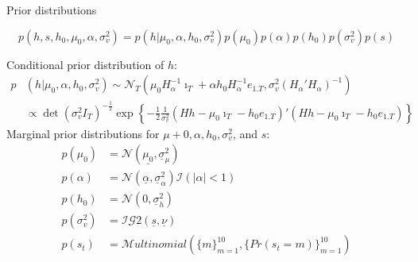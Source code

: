 \documentclass[notes,blackandwhite,mathsans,usenames,dvipsnames]{beamer}
\begin{document}
\begin{frame}{Prior distributions}

\small
{}
$$
p\left(h,s,h_0,\mu_0, \alpha,\sigma_v^2\right) = p\left(h|\mu_0, \alpha,h_0, \sigma_v^2\right) p\left( \mu_0 \right) p\left(\alpha \right)p\left(h_0\right)p\left(\sigma_v^2\right)p\left(s\right)
$$

{\color{mcxs2}Conditional prior distribution of} $h$:
\begin{align*}
p&\left(h|\mu_0, \alpha,h_0, \sigma_v^2\right) \sim\mathcal{N}_T\left(\mu_0 H_\alpha^{-1}\imath_T+ \alpha h_0H_\alpha^{-1}e_{1.T}, \sigma_v^2(H_\alpha'H_\alpha)^{-1} \right)\\
&\propto \det\left(\sigma^2_vI_T\right)^{-
\frac{1}{2}}\exp\left\{ -\frac{1}{2} \frac{1}{\sigma_v^2}(Hh - \mu_0\imath_T - h_0 e_{1.T})'(Hh - \mu_0\imath_T - h_0 e_{1.T}) \right\}
\end{align*}
{\color{mcxs2}Marginal prior distributions for} $\mu+0, \alpha, h_0,\sigma_v^2$, {\color{mcxs2}and} $s$:
\begin{align*}
p(\mu_0) &= \mathcal{N}(\underline{\mu_0}, \underline{\sigma}_\mu^2) \\
p(\alpha) &= \mathcal{N}(\underline{\alpha}, \underline{\sigma}_\alpha^2)\mathcal{I}(|\alpha|<1)\\
p(h_0) &= \mathcal{N}(0, \underline{\sigma}_h^2) \\
p\left(\sigma_v^2\right) &= \mathcal{IG}2(\underline{s}, \underline{\nu})\\
p\left(s_t\right) &= \mathcal{M}ultinomial\left(\{m\}_{m=1}^{10}, \{Pr(s_t=m)\}_{m=1}^{10} \right)
\end{align*}

\end{frame}
\end{document}
